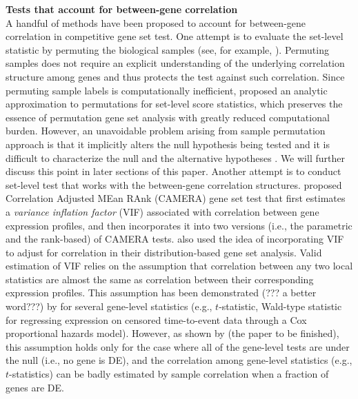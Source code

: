 \documentclass[11pt, a4paper]{article}
\begin{document}
	  \textbf{Tests that account for between-gene correlation}\\
	  A handful of methods have been proposed to account for between-gene correlation in competitive gene set test. One attempt is to evaluate the set-level statistic by permuting the biological samples (see, for example, \cite{subramanian2005gene, efron2007testing}). Permuting samples does not require an explicit understanding of the underlying correlation structure among genes and thus protects the test against such correlation. Since permuting sample labels is computationally inefficient, \cite{zhou2013empirical} proposed an analytic approximation to permutations for set-level score statistics, which preserves the essence of permutation gene set analysis with greatly reduced computational burden.  However, an unavoidable problem arising from sample permutation approach is that it implicitly alters the null hypothesis being tested and it is difficult to characterize the null and the alternative hypotheses \citep{goeman2007analyzing, khatri2012ten, 
	  	wu2012camera}. We will further discuss this point in later sections of this paper. Another attempt is to conduct set-level test that works with the between-gene correlation structures. \cite{wu2012camera} proposed Correlation Adjusted MEan RAnk (CAMERA) gene set test that first estimates a \textit{variance inflation factor} (VIF) associated with correlation between gene expression profiles, and then incorporates it into two versions (i.e., the parametric and the rank-based) of CAMERA tests. \cite{yaari2013quantitative} also used the idea of incorporating VIF to adjust for correlation in their distribution-based gene set analysis. Valid estimation of VIF relies on the assumption that correlation between any two local statistics are almost the same as correlation between their corresponding expression profiles. This assumption has been demonstrated (??? a better word???) by \cite{barry2008statistical} for several gene-level statistics (e.g., $t$-statistic, Wald-type statistic for regressing expression on censored time-to-event data through a Cox proportional hazards model). However, as shown by (the paper to be finished), this assumption holds only for the case where all of the gene-level tests are under the null (i.e., no gene is DE), and the correlation among gene-level statistics (e.g., $t$-statistics) can be badly estimated by sample correlation when a fraction of genes are DE. 
\end{document}

